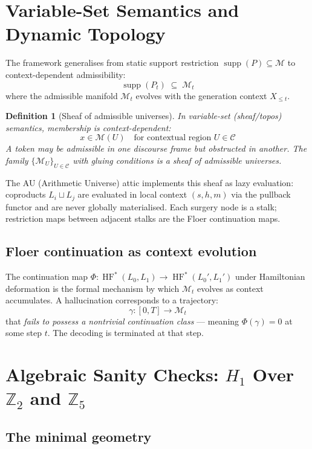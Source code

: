 \documentclass[11pt,a4paper]{article}
\newtheorem{definition}[theorem]{Definition}
\DeclareMathOperator{\HF}{HF}
\DeclareMathOperator{\supp}{supp}
\newcommand{\Mfld}{\mathcal{M}}
\begin{document}
\section{Variable-Set Semantics and Dynamic Topology}

The framework generalises from static support restriction
$\supp(P) \subseteq \Mfld$ to context-dependent admissibility:
\[
  \supp(P_t) \;\subseteq\; \Mfld_t
\]
where the admissible manifold $\Mfld_t$ evolves with the
generation context $X_{\leq t}$.

\begin{definition}[Sheaf of admissible universes]
In variable-set (sheaf/topos) semantics, membership is
context-dependent:
\[
  x \in \Mfld(U) \quad\text{for contextual region } U \in \mathcal{C}
\]
A token may be admissible in one discourse frame but obstructed
in another. The family $\{\Mfld_U\}_{U \in \mathcal{C}}$ with
gluing conditions is a \emph{sheaf of admissible universes}.
\end{definition}

The AU (Arithmetic Universe) attic implements this sheaf as
lazy evaluation: coproducts $L_i \sqcup L_j$ are evaluated
in local context $(s,h,m)$ via the pullback functor and are
never globally materialised. Each surgery node is a stalk;
restriction maps between adjacent stalks are the Floer
continuation maps.

\subsection{Floer continuation as context evolution}

The continuation map $\Phi: \HF^*(L_0, L_1) \to \HF^*(L_0', L_1')$
under Hamiltonian deformation is the formal mechanism by which
$\Mfld_t$ evolves as context accumulates. A hallucination
corresponds to a trajectory:
\[
  \gamma: [0,T] \to \Mfld_t
\]
that \emph{fails to possess a nontrivial continuation class} ---
meaning $\Phi(\gamma) = 0$ at some step $t$. The decoding is
terminated at that step.

\section{Algebraic Sanity Checks: $H_1$ Over $\mathbb{Z}_2$ and $\mathbb{Z}_5$}
\label{sec:algebraic}

\subsection{The minimal geometry}
\end{document}

